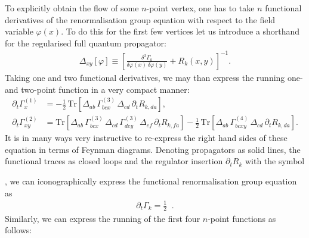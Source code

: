 \documentclass[11pt]{book}
\newcommand{\Tr}{\mathrm{Tr}}
\numberwithin{equation}{chapter}
\begin{document}
To explicitly obtain the flow of some $n$-point vertex, one has to take
$n$ functional derivatives of the renormalisation group equation with respect
to the field variable $\varphi(x)$. To do this for the first few vertices
let us introduce a shorthand for the regularised full quantum propagator:
\begin{align}
  \Delta_{xy} [\varphi] \equiv
  \left[
    \frac{\delta^{2}\Gamma_k}{\delta\varphi(x) \, \delta\varphi(y)} + R_k(x,y)
  \right]^{-1} .
\end{align}
Taking one and two functional derivatives, we may than express the running one-
and two-point function in a very compact manner:
\begin{align}
  \partial_t \Gamma^{(1)}_{x} &=
  - \frac 12 \, \Tr
  \left[
    \Delta_{ab} \,
    \Gamma^{(3)}_{bcx} \,
    \Delta_{cd} \,
    \partial_t R_{k,da}
  \right] , \\
  \partial_t \Gamma^{(2)}_{xy} &=
  \Tr
  \left[
    \Delta_{ab} \,
    \Gamma^{(3)}_{bcx} \,
    \Delta_{cd} \,
    \Gamma^{(3)}_{dey} \,
    \Delta_{ef} \,
    \partial_t R_{k,fa}
  \right]
  - \frac 12 \, \Tr
  \left[
    \Delta_{ab} \,
    \Gamma^{(4)}_{bcxy} \,
    \Delta_{cd} \,
    \partial_t R_{k,da}
  \right] .
\end{align}
It is in many ways very instructive to re-express the right hand sides of
these equation in terms of Feynman diagrams. Denoting propagators
as solid lines, the functional traces as closed loops and the regulator
insertion $\partial_t R_k$ with the symbol

\hspace{-2.8mm}
, we can iconographically express the
functional renormalisation group equation as
\begin{align}
  \partial_t \Gamma_k = \frac12 \;
   \;.
\end{align}
Similarly, we can express the running of the first four $n$-point
functions as follows:
\end{document}
